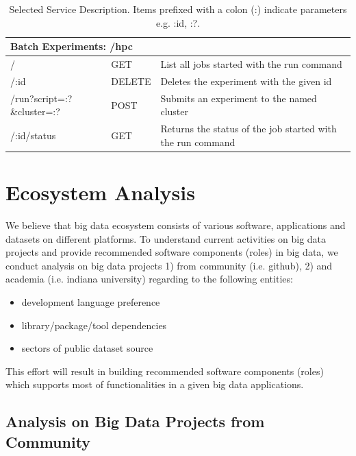 \documentclass[9pt,twocolumn,twoside]{styles/osajnl}
\newcommand{\grey}{\cellcolor{lightgray}}  %
\begin{document}
\begin{table}[htb]
\begin{center}
\begin{small}
\begin{tabular}{|l|l|l|}
\hline \multicolumn{3}{|l|}{\grey\bf Batch Experiments: /hpc} \tabularnewline \hline
/                          & GET    & List all jobs started with the run command \tabularnewline \hline
/:id                       & DELETE & Deletes the experiment with the given id \tabularnewline \hline
/run?script=:?\&cluster=:? & POST   & Submits an experiment to the named cluster \tabularnewline \hline
/:id/status                & GET    & Returns the status of the job started with the run command \tabularnewline \hline

      \end{tabular}
    \end{small}
    \caption{Selected Service Description. Items prefixed with a colon (:) indicate parameters e.g. :id, :?.}
    \label{T:rest}
  \end{center}
\end{table}



\section{Ecosystem Analysis}

We believe that big data ecosystem consists of various software,
applications and datasets on different platforms. To understand
current activities on big data projects and provide recommended
software components (roles) in big data, we conduct analysis on big
data projects 1) from community (i.e. github), 2) and academia
(i.e. indiana university) regarding to the following entities:

\begin{itemize}
\item development language preference
\item library/package/tool dependencies
\item sectors of public dataset source
\end{itemize}

This effort will result in building recommended software components
(roles) which supports most of functionalities in a given big data
applications.

\subsection{Analysis on Big Data Projects from Community}
\end{document}

